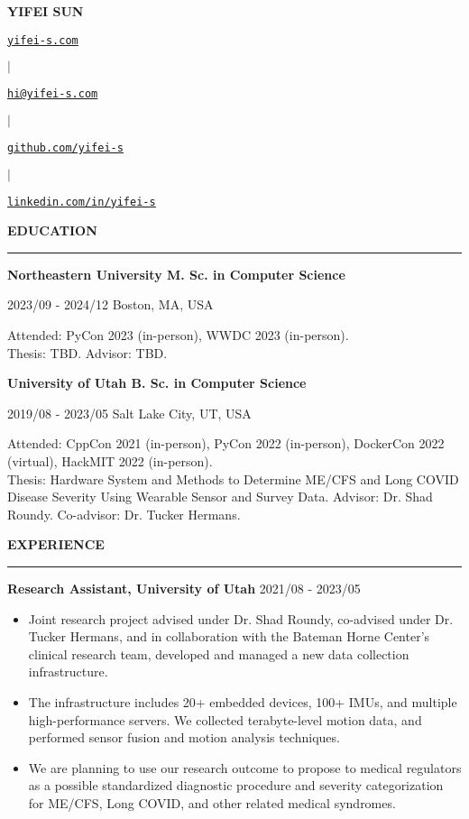 \documentclass{letter}
\newcommand{\link}[2]{
\href{#1}{\underline{\texttt{#2}}}
}
\newcommand{\section}[1]{
\Large{\textbf{\MakeUppercase{#1}}}

\vspace{-0.3in}
\rule{\textwidth}{0.25mm}
\vspace{-0.35in}
}
\newcommand{\education}[5]{
\large{\textbf{#1 \hfill #2}}

\vspace{-1.5mm}

\normalsize{#3 \hfill #4}

\vspace{-1.5mm}

\normalsize{#5}
}
\newcommand{\experience}[3]{
\large{\textbf{#1} \hfill \normalsize{#2}}

\vspace{-2.5mm}

\normalsize{#3}

\vspace{-2.5mm}
}
\begin{document}
\begin{center}
\huge{\textbf{\MakeUppercase{Yifei Sun}}} 

\normalsize{
\link{https://yifei.md}{yifei-s.com}
\hspace{1mm}$\mid$\hspace{1mm}
\link{mailto:yifei@email.com}{hi@yifei-s.com}
\hspace{1mm}$\mid$\hspace{1mm}
\link{https://github.com/stepbrobd}{github.com/yifei-s}
\hspace{1mm}$\mid$\hspace{1mm}
\link{https://www.linkedin.com/in/yifei-s}{linkedin.com/in/yifei-s}
}
\end{center}

\section{Education}

\education{Northeastern University}
{M. Sc. in Computer Science}
{2023/09 - 2024/12}
{Boston, MA, USA} {
Attended: PyCon 2023 (in-person), WWDC 2023 (in-person).\\
Thesis: TBD. Advisor: TBD.
}

\education{University of Utah}
{B. Sc. in Computer Science}
{2019/08 - 2023/05}
{Salt Lake City, UT, USA} {
Attended: CppCon 2021 (in-person), PyCon 2022 (in-person), DockerCon 2022 (virtual), HackMIT 2022 (in-person).\\
Thesis: Hardware System and Methods to Determine ME/CFS and Long COVID Disease Severity Using Wearable Sensor and Survey Data. Advisor: Dr. Shad Roundy. Co-advisor: Dr. Tucker Hermans.
}

\section{Experience}

\experience{Research Assistant, University of Utah}{2021/08 - 2023/05} {
\begin{itemize}
\item Joint research project advised under Dr. Shad Roundy, co-advised under Dr. Tucker Hermans, and in collaboration with the Bateman Horne Center's clinical research team, developed and managed a new data collection infrastructure.
\item The infrastructure includes 20+ embedded devices, 100+ IMUs, and multiple high-performance servers. We collected terabyte-level motion data, and performed sensor fusion and motion analysis techniques.
\item We are planning to use our research outcome to propose to medical regulators as a possible standardized diagnostic procedure and severity categorization for ME/CFS, Long COVID, and other related medical syndromes.
\end{itemize}
}
\end{document}
